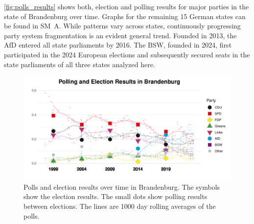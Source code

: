 \documentclass[12pt]{article}
\begin{document}
\begin{doublespacing}






\autoref{fig:polls_results} shows both,  election and polling results for major parties in the state of Brandenburg over time. Graphs for the remaining 15 German states can be found in SM~A. While patterns vary across states, continuously progressing party system fragmentation is an evident general trend. Founded in 2013, the AfD entered all state parliaments by 2016. The BSW, founded in 2024, first participated in the 2024 European elections and subsequently secured seats in the state parliaments of all three states analyzed here. %


\begin{figure}[!t]
    \centering
    \includegraphics[width=\textwidth]{fg1_fig_poll_bb.pdf}  
    \caption{Polls and election results over time in Brandenburg. The symbols show the election results. The small dots show polling results between elections. The lines are 1000 day rolling averages of the polls.}
    \label{fig:polls_results}
\end{figure}


\end{doublespacing}
\end{document}
